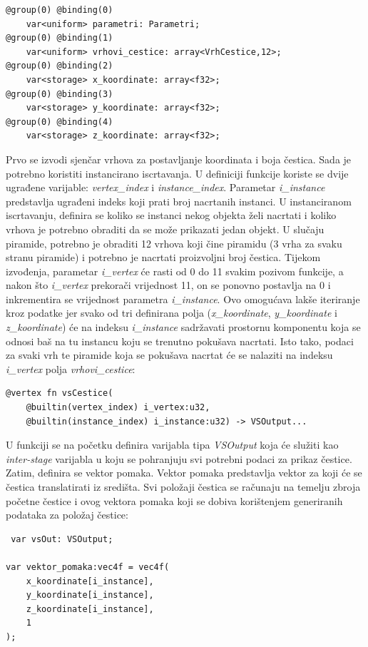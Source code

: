 \documentclass{foi}
\begin{document}
\begin{verbatim}
@group(0) @binding(0) 
	var<uniform> parametri: Parametri;
@group(0) @binding(1) 
	var<uniform> vrhovi_cestice: array<VrhCestice,12>;
@group(0) @binding(2) 
	var<storage> x_koordinate: array<f32>;
@group(0) @binding(3) 
	var<storage> y_koordinate: array<f32>;
@group(0) @binding(4)
	var<storage> z_koordinate: array<f32>;

\end{verbatim} 


Prvo se izvodi sjenčar vrhova za postavljanje koordinata i boja čestica. Sada je potrebno koristiti instancirano iscrtavanja. U definiciji funkcije koriste se dvije ugrađene varijable: \textit{vertex\_index} i \textit{instance\_index}. Parametar \textit{i\_instance} predstavlja ugrađeni indeks koji prati broj nacrtanih instanci. U instanciranom iscrtavanju, definira se koliko se instanci nekog objekta želi nacrtati i koliko vrhova je potrebno obraditi da se može prikazati jedan objekt. U slučaju piramide, potrebno je obraditi 12 vrhova koji čine piramidu (3 vrha za svaku stranu piramide) i potrebno je nacrtati proizvoljni broj čestica. Tijekom izvođenja, parametar \textit{i\_vertex} će rasti od 0 do 11 svakim pozivom funkcije, a nakon što \textit{i\_vertex} prekorači vrijednost 11, on se ponovno postavlja na 0 i inkrementira se vrijednost parametra \textit{i\_instance}. Ovo omogućava lakše iteriranje kroz podatke jer svako od tri definirana polja (\textit{x\_koordinate}, \textit{y\_koordinate} i \textit{z\_koordinate}) će na indeksu \textit{i\_instance} sadržavati prostornu komponentu koja se odnosi baš na tu instancu koju se trenutno pokušava nacrtati. Isto tako, podaci za svaki vrh te piramide koja se pokušava nacrtat će se nalaziti na indeksu \textit{i\_vertex} polja \textit{vrhovi\_cestice}:

\begin{verbatim}
@vertex fn vsCestice(
	@builtin(vertex_index) i_vertex:u32,
	@builtin(instance_index) i_instance:u32) -> VSOutput...
\end{verbatim}

U funkciji se na početku definira varijabla tipa \textit{VSOutput} koja će služiti kao \textit{inter-stage} varijabla u koju se pohranjuju svi potrebni podaci za prikaz čestice. Zatim, definira se vektor pomaka. Vektor pomaka predstavlja vektor za koji će se čestica translatirati iz središta. Svi položaji čestica se računaju na temelju zbroja početne čestice i ovog vektora pomaka koji se dobiva korištenjem generiranih podataka za položaj čestice:
\begin{verbatim}
 var vsOut: VSOutput;

var vektor_pomaka:vec4f = vec4f(
	x_koordinate[i_instance],
	y_koordinate[i_instance],
	z_koordinate[i_instance],
	1
);

\end{verbatim}
\end{document}
